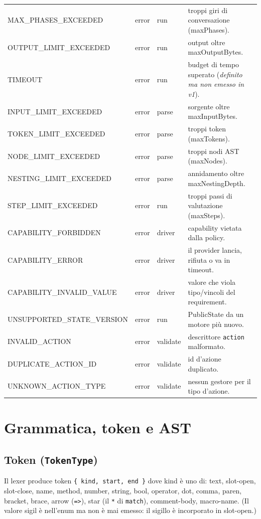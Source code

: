 \documentclass[11pt,a4paper]{book}
\let\code\lstinline
\newcommand{\ic}[1]{{\ttfamily #1}}
\theoremstyle{definition}
\begin{document}
{{{{\begin{center}
\begin{longtable}{@{}l l l p{6.4cm}@{}}
\ic{MAX\_PHASES\_EXCEEDED} & error & run & troppi giri di conversazione (\ic{maxPhases}). \\
\ic{OUTPUT\_LIMIT\_EXCEEDED} & error & run & output oltre \ic{maxOutputBytes}. \\
\ic{TIMEOUT} & error & run & budget di tempo superato (\emph{definito ma non emesso in v1}). \\
\ic{INPUT\_LIMIT\_EXCEEDED} & error & parse & sorgente oltre \ic{maxInputBytes}. \\
\ic{TOKEN\_LIMIT\_EXCEEDED} & error & parse & troppi token (\ic{maxTokens}). \\
\ic{NODE\_LIMIT\_EXCEEDED} & error & parse & troppi nodi AST (\ic{maxNodes}). \\
\ic{NESTING\_LIMIT\_EXCEEDED} & error & parse & annidamento oltre \ic{maxNestingDepth}. \\
\ic{STEP\_LIMIT\_EXCEEDED} & error & run & troppi passi di valutazione (\ic{maxSteps}). \\
\ic{CAPABILITY\_FORBIDDEN} & error & driver & capability vietata dalla policy. \\
\ic{CAPABILITY\_ERROR} & error & driver & il provider lancia, rifiuta o va in timeout. \\
\ic{CAPABILITY\_INVALID\_VALUE} & error & driver & valore che viola tipo/vincoli del requirement. \\
\ic{UNSUPPORTED\_STATE\_VERSION} & error & run & \ic{PublicState} da un motore più nuovo. \\
\ic{INVALID\_ACTION} & error & validate & descrittore \code|action| malformato. \\
\ic{DUPLICATE\_ACTION\_ID} & error & validate & id d'azione duplicato. \\
\ic{UNKNOWN\_ACTION\_TYPE} & error & validate & nessun gestore per il tipo d'azione. \\
\end{longtable}
\end{center}

\chapter{Grammatica, token e AST}
\label{app:grammatica}

\section{Token (\texttt{TokenType})}

Il lexer produce token \verb|{ kind, start, end }| dove \ic{kind} è uno di:
\ic{text}, \ic{slot-open}, \ic{slot-close}, \ic{name}, \ic{method}, \ic{number},
\ic{string}, \ic{bool}, \ic{operator}, \ic{dot}, \ic{comma}, \ic{paren},
\ic{bracket}, \ic{brace}, \ic{arrow} (\code|=>|), \ic{star} (il \code|*| di
\code|match|), \ic{comment-body}, \ic{macro-name}. (Il valore \ic{sigil} è nell'enum
ma non è mai emesso: il sigillo è incorporato in \ic{slot-open}.)

}}}}
\end{document}

